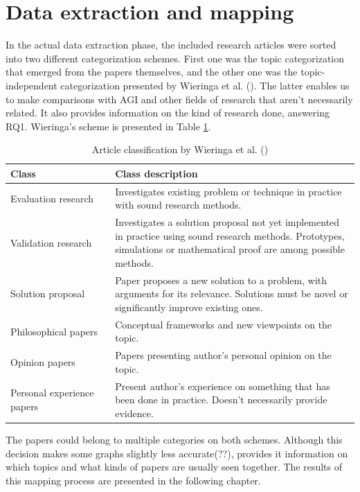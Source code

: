 \documentclass[utf8,english]{gradu3}
\begin{document}
\section{Data extraction and mapping}

In the actual data extraction phase, the included research articles were sorted
into two different categorization schemes. First one was the topic
categorization that emerged from the papers themselves, and the other one was
the topic-independent categorization presented by Wieringa et al.
(\cite*{wieringa2006}). The latter enables us to make comparisons with AGI and
other fields of research that aren't necessarily related. It also provides
information on the kind of research done, answering RQ1. Wieringa's scheme is
presented in Table \ref{table:wieringa}.

\begin{table}[H]
  \footnotesize
  \centering
  \begin{tabular}{p{0.30\linewidth} p{0.70\linewidth}}

    \textbf{Class}  & \textbf{Class description}  \\ \hline
    Evaluation research & Investigates existing problem or technique in practice with sound research methods. \\ \hline
    Validation research & Investigates a solution proposal not yet implemented in practice using sound research methods. Prototypes, simulations or mathematical proof are among possible methods. \\ \hline
    Solution proposal & Paper proposes a new solution to a problem, with arguments for its relevance. Solutions must be novel or significantly improve existing ones. \\ \hline
    Philosophical papers & Conceptual frameworks and new viewpoints on the topic. \\ \hline
    Opinion papers & Papers presenting author's personal opinion on the topic. \\ \hline
    Personal experience papers & Present author's experience on something that has been done in practice. Doesn't necessarily provide evidence. \\ \hline

  \end{tabular}
  \caption{Article classification by Wieringa et al. (\cite*{wieringa2006})}
  \label{table:wieringa}
\end{table}

The papers could belong to multiple categories on both schemes. Although this
decision makes some graphs slightly less accurate(??), provides it information
on which topics and what kinds of papers are usually seen together. The results
of this mapping process are presented in the following chapter.
\end{document}
